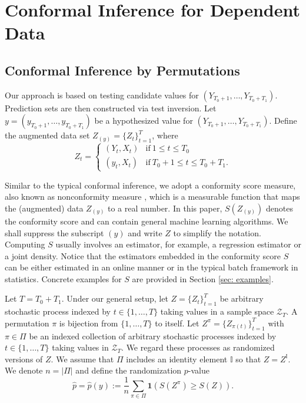 \documentclass[final,12pt]{colt2018} %
\begin{document}

\section{Conformal Inference for Dependent Data}
\label{sec: conformal prediction}

\subsection{Conformal Inference by Permutations}
Our approach is based on testing candidate values for $(Y_{T_0+1},\dots,Y_{T_0+T_1})$. Prediction sets are then constructed via test inversion. Let $y=(y_{T_0+1},\dots,y_{T_0+T_1}) $ be a hypothesized value for $(Y_{T_0+1},\dots,Y_{T_0+T_1}) $. Define the augmented data set $Z_{(y)}=\{Z_t\}_{t=1}^T$, where
\begin{equation}\label{eq: def Z}
Z_t=\begin{cases}
(Y_t,X_t) & \textrm{if}\ 1\leq t\leq T_0 \\
(y_t,X_t) & \textrm{if}\ T_0+1\leq t \leq T_0+T_1.
\end{cases}
\end{equation}


Similar to the typical conformal inference, we adopt a conformity score measure, also known as nonconformity measure \citep{vovk2009online}, which is a measurable function that maps the (augmented) data $Z_{(y)} $ to a real number. In this paper, $S(Z_{(y)} )$  denotes the conformity score and can contain  general machine learning algorithms. We shall suppress the subscript $(y)$ and write $Z$ to simplify the notation. Computing $S$ usually involves an estimator, for example, a regression estimator or a joint density. Notice that the estimators embedded in the conformity score $S$ can be either estimated  in an online manner or in the typical batch framework in statistics. Concrete examples for $S$ are provided in Section \ref{sec: examples}. 


Let $T=T_0+T_1$. Under our general setup, let $Z = \{ Z_t\}_{t=1}^T $ be arbitrary stochastic process indexed by $t \in \{1,\dots,T\}$ taking values in a sample space $\mathcal{Z}_T$. A permutation $\pi$ is bijection from $\{1,\dots,T\} $ to itself.  Let $Z^\pi = \{ Z_{\pi(t)}\}_{t=1}^T $ with $\pi \in \Pi$ be an indexed collection of arbitrary stochastic processes indexed by $t \in \{1,\dots,T\}$ taking values in  $ \mathcal{Z}_T$.  We regard these 
processes as randomized versions of $Z $. We assume that $\Pi$ includes an identity element $\mathbb{I}$ so that $Z= Z^{\mathbb{I}}$. We denote $n=|\Pi|$ and define the randomization $p$-value
$$
\hat p =\hat p(y) := \frac{1}{n} \sum_{\pi \in \Pi} \mathbf{1} ( S(Z^\pi) \geq S(Z)).
$$
\end{document}
